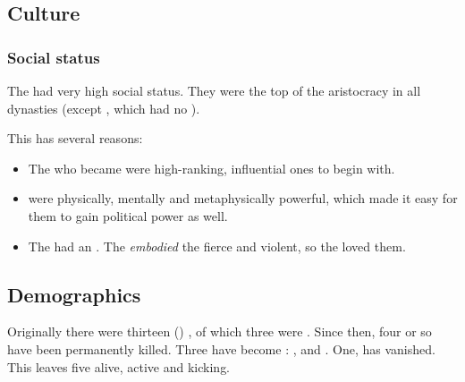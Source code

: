 








\subsection{Culture}





\subsubsection{Social status}
The \satharioth had very high social status. 
They were the top of the \resphan aristocracy in all dynasties (except \Baelzerach, which had no \satharioth). 

This has several reasons:
\begin{itemize}
  \item 
    The \resphain who became \satharioth were high-ranking, influential ones to begin with.
  \item 
    \Satharioth were physically, mentally and metaphysically powerful, which made it easy for them to gain political power as well.
  \item 
    The \resphain had an . 
    The \satharioth \emph{embodied} the fierce and violent, so the \resphain loved them. 
\end{itemize}












\subsection{Demographics}
Originally there were thirteen () \satharioth{}, of which three were \resviel. 
Since then, four or so have been permanently killed. 
Three \satharioth{} have become \malachim: ,  and . 
One,  has vanished. 
This leaves five \satharioth{} alive, active and kicking. 

